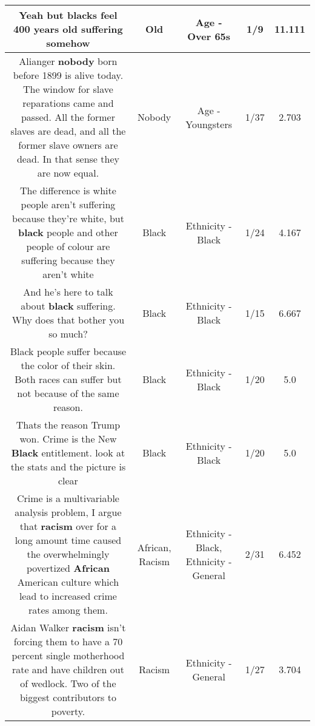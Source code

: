 \documentclass[11pt]{article}
\newlength\mylength
\begin{document}
\begin{center}
\begin{longtable}{|C{.65\mylength}|C{.30\mylength}|C{.12\mylength}|C{.12\mylength}|C{.12\mylength}|}
  \small Yeah but blacks feel 400 years \textbf{old} suffering somehow\normalsize   & Old & Age - Over 65s & 1/9 & 11.111 \\  \hline
  \small Alianger \textbf{nobody} born before 1899 is alive today. The window for slave reparations came and passed. All the former slaves are dead, and all the former slave owners are dead. In that sense they are now equal.\normalsize   & Nobody & Age - Youngsters & 1/37 & 2.703 \\  \hline
  \small The difference is white people aren't suffering because they're white, but \textbf{black} people and other people of colour are suffering because they aren't white\normalsize   & Black & Ethnicity - Black & 1/24 & 4.167 \\  \hline
  \small And he's here to talk about \textbf{black} suffering. Why does that bother you so much?\normalsize   & Black & Ethnicity - Black & 1/15 & 6.667 \\  \hline
  \small Black people suffer because the color of their skin. Both races can suffer but not because of the same reason.\normalsize   & Black & Ethnicity - Black & 1/20 & 5.0 \\  \hline
  \small Thats the reason Trump won. Crime is the New \textbf{Black} entitlement.  look at the stats and the picture is clear\normalsize   & Black & Ethnicity - Black & 1/20 & 5.0 \\  \hline
  \small Crime is a multivariable analysis problem, I argue that \textbf{racism} over for a long amount time caused the overwhelmingly povertized \textbf{African} American culture which lead to increased crime rates among them.\normalsize   & African, Racism & Ethnicity - Black, Ethnicity - General & 2/31 & 6.452 \\  \hline
  \small Aidan Walker \textbf{racism} isn't forcing them to have a 70 percent single motherhood rate and have children out of wedlock. Two of the biggest contributors to poverty.\normalsize   & Racism & Ethnicity - General & 1/27 & 3.704 \\  \hline

\end{longtable}
\end{center}
\end{document}
